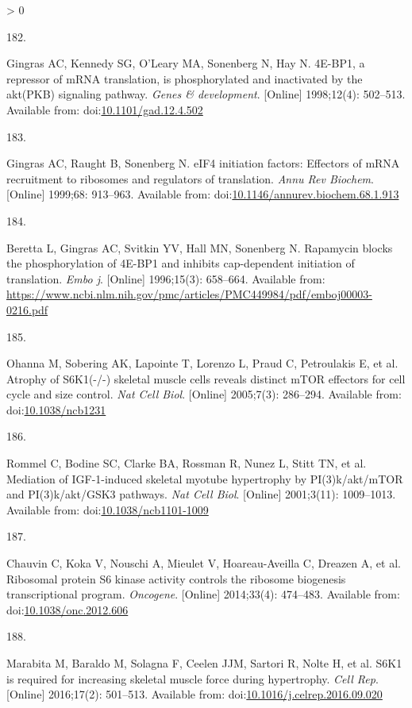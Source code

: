 \documentclass[twoside,10pt]{gihclass} %
\newlength{\cslhangindent}
\newlength{\csllabelwidth}
\newenvironment{CSLReferences}[3] %
 {%
  \setlength{\parindent}{0pt}
  \ifodd #1 \everypar{\setlength{\hangindent}{\cslhangindent}}\ignorespaces\fi
  \ifnum #2 > 0
  \setlength{\parskip}{#2\baselineskip}
  \fi
 }%
 {}
\newcommand{\CSLLeftMargin}[1]{\parbox[t]{\maxof{\widthof{#1}}{\csllabelwidth}}{#1}}
\newcommand{\CSLRightInline}[1]{\parbox[t]{\linewidth}{#1}}
\begin{document}
\begin{CSLReferences}{0}{0}
\leavevmode\hypertarget{ref-RN2837}{}%
\CSLLeftMargin{182. }
\CSLRightInline{Gingras AC, Kennedy SG, O'Leary MA, Sonenberg N, Hay N. 4E-BP1, a repressor of mRNA translation, is phosphorylated and inactivated by the akt(PKB) signaling pathway. \emph{Genes \& development}. {[}Online{]} 1998;12(4): 502--513. Available from: doi:\href{https://doi.org/10.1101/gad.12.4.502}{10.1101/gad.12.4.502}}

\leavevmode\hypertarget{ref-RN2838}{}%
\CSLLeftMargin{183. }
\CSLRightInline{Gingras AC, Raught B, Sonenberg N. eIF4 initiation factors: Effectors of mRNA recruitment to ribosomes and regulators of translation. \emph{Annu Rev Biochem}. {[}Online{]} 1999;68: 913--963. Available from: doi:\href{https://doi.org/10.1146/annurev.biochem.68.1.913}{10.1146/annurev.biochem.68.1.913}}

\leavevmode\hypertarget{ref-RN2840}{}%
\CSLLeftMargin{184. }
\CSLRightInline{Beretta L, Gingras AC, Svitkin YV, Hall MN, Sonenberg N. Rapamycin blocks the phosphorylation of 4E-BP1 and inhibits cap-dependent initiation of translation. \emph{Embo j}. {[}Online{]} 1996;15(3): 658--664. Available from: \url{https://www.ncbi.nlm.nih.gov/pmc/articles/PMC449984/pdf/emboj00003-0216.pdf}}

\leavevmode\hypertarget{ref-RN2828}{}%
\CSLLeftMargin{185. }
\CSLRightInline{Ohanna M, Sobering AK, Lapointe T, Lorenzo L, Praud C, Petroulakis E, et al. Atrophy of S6K1(-/-) skeletal muscle cells reveals distinct mTOR effectors for cell cycle and size control. \emph{Nat Cell Biol}. {[}Online{]} 2005;7(3): 286--294. Available from: doi:\href{https://doi.org/10.1038/ncb1231}{10.1038/ncb1231}}

\leavevmode\hypertarget{ref-RN783}{}%
\CSLLeftMargin{186. }
\CSLRightInline{Rommel C, Bodine SC, Clarke BA, Rossman R, Nunez L, Stitt TN, et al. Mediation of IGF-1-induced skeletal myotube hypertrophy by PI(3)k/akt/mTOR and PI(3)k/akt/GSK3 pathways. \emph{Nat Cell Biol}. {[}Online{]} 2001;3(11): 1009--1013. Available from: doi:\href{https://doi.org/10.1038/ncb1101-1009}{10.1038/ncb1101-1009}}

\leavevmode\hypertarget{ref-RN2321}{}%
\CSLLeftMargin{187. }
\CSLRightInline{Chauvin C, Koka V, Nouschi A, Mieulet V, Hoareau-Aveilla C, Dreazen A, et al. Ribosomal protein S6 kinase activity controls the ribosome biogenesis transcriptional program. \emph{Oncogene}. {[}Online{]} 2014;33(4): 474--483. Available from: doi:\href{https://doi.org/10.1038/onc.2012.606}{10.1038/onc.2012.606}}

\leavevmode\hypertarget{ref-RN2849}{}%
\CSLLeftMargin{188. }
\CSLRightInline{Marabita M, Baraldo M, Solagna F, Ceelen JJM, Sartori R, Nolte H, et al. S6K1 is required for increasing skeletal muscle force during hypertrophy. \emph{Cell Rep}. {[}Online{]} 2016;17(2): 501--513. Available from: doi:\href{https://doi.org/10.1016/j.celrep.2016.09.020}{10.1016/j.celrep.2016.09.020}}


\end{CSLReferences}
\end{document}
